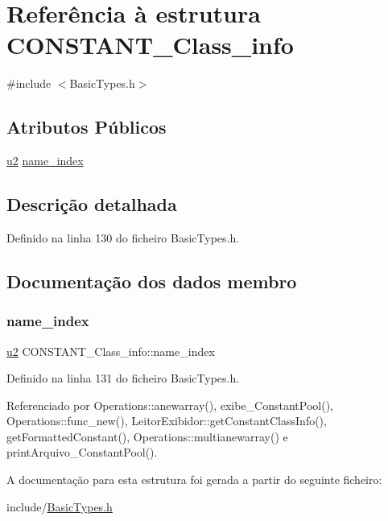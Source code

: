 \hypertarget{structCONSTANT__Class__info}{}\section{Referência à estrutura C\+O\+N\+S\+T\+A\+N\+T\+\_\+\+Class\+\_\+info}
\label{structCONSTANT__Class__info}


{\ttfamily \#include $<$Basic\+Types.\+h$>$}

\subsection*{Atributos Públicos}
\begin{DoxyCompactItemize}
\item 
\hyperlink{BasicTypes_8h_a732cde1300aafb73b0ea6c2558a7a54f}{u2} \hyperlink{structCONSTANT__Class__info_af37beebaf6ea2ba2d4b4d298d41d2904}{name\+\_\+index}
\end{DoxyCompactItemize}


\subsection{Descrição detalhada}


Definido na linha 130 do ficheiro Basic\+Types.\+h.



\subsection{Documentação dos dados membro}
\mbox{\label{structCONSTANT__Class__info_af37beebaf6ea2ba2d4b4d298d41d2904}} 
\subsubsection{\texorpdfstring{name\+\_\+index}{name\_index}}
{\footnotesize\ttfamily \hyperlink{BasicTypes_8h_a732cde1300aafb73b0ea6c2558a7a54f}{u2} C\+O\+N\+S\+T\+A\+N\+T\+\_\+\+Class\+\_\+info\+::name\+\_\+index}



Definido na linha 131 do ficheiro Basic\+Types.\+h.



Referenciado por Operations\+::anewarray(), exibe\+\_\+\+Constant\+Pool(), Operations\+::func\+\_\+new(), Leitor\+Exibidor\+::get\+Constant\+Class\+Info(), get\+Formatted\+Constant(), Operations\+::multianewarray() e print\+Arquivo\+\_\+\+Constant\+Pool().



A documentação para esta estrutura foi gerada a partir do seguinte ficheiro\+:\begin{DoxyCompactItemize}
\item 
include/\hyperlink{BasicTypes_8h}{Basic\+Types.\+h}\end{DoxyCompactItemize}
